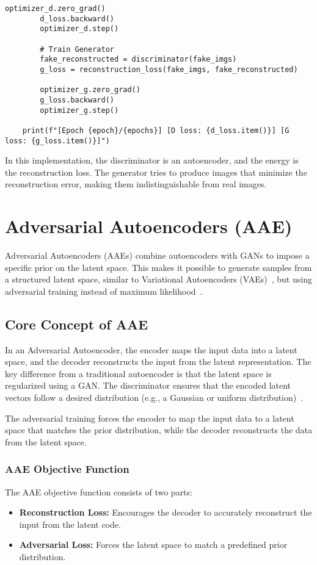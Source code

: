 \begin{lstlisting}[style=python]
        optimizer_d.zero_grad()
        d_loss.backward()
        optimizer_d.step()

        # Train Generator
        fake_reconstructed = discriminator(fake_imgs)
        g_loss = reconstruction_loss(fake_imgs, fake_reconstructed)

        optimizer_g.zero_grad()
        g_loss.backward()
        optimizer_g.step()

    print(f"[Epoch {epoch}/{epochs}] [D loss: {d_loss.item()}] [G loss: {g_loss.item()}]")
\end{lstlisting}

In this implementation, the discriminator is an autoencoder, and the energy is the reconstruction loss. The generator tries to produce images that minimize the reconstruction error, making them indistinguishable from real images.

\section{Adversarial Autoencoders (AAE)}
Adversarial Autoencoders (AAEs) combine autoencoders with GANs to impose a specific prior on the latent space. This makes it possible to generate samples from a structured latent space, similar to Variational Autoencoders (VAEs)~\cite{doersch2016tutorial}, but using adversarial training instead of maximum likelihood~\cite{makhzani2015adversarial}.

\subsection{Core Concept of AAE}
In an Adversarial Autoencoder, the encoder maps the input data into a latent space, and the decoder reconstructs the input from the latent representation. The key difference from a traditional autoencoder is that the latent space is regularized using a GAN. The discriminator ensures that the encoded latent vectors follow a desired distribution (e.g., a Gaussian or uniform distribution)~\cite{li2024survey}.

The adversarial training forces the encoder to map the input data to a latent space that matches the prior distribution, while the decoder reconstructs the data from the latent space.

\subsubsection{AAE Objective Function}
The AAE objective function consists of two parts:
\begin{itemize}
    \item \textbf{Reconstruction Loss:} Encourages the decoder to accurately reconstruct the input from the latent code.
    \item \textbf{Adversarial Loss:} Forces the latent space to match a predefined prior distribution.
\end{itemize}

